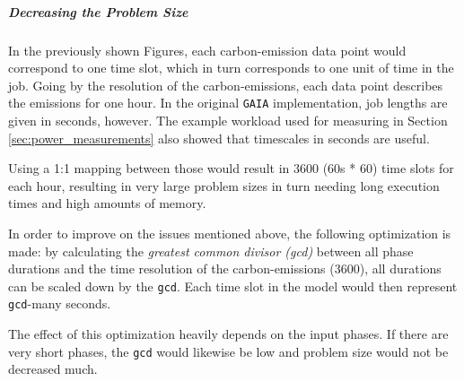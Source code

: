 \subparagraph{Decreasing the Problem Size}

In the previously shown Figures, each carbon-emission data point would correspond to one time slot, which in turn corresponds to one unit of time in the job. 
Going by the resolution of the carbon-emissions, each data point describes the emissions for one hour. 
In the original \verb|GAIA| implementation, job lengths are given in seconds, however. 
The example workload used for measuring in Section \ref{sec:power_measurements} also showed that timescales in seconds are useful. 

Using a 1:1 mapping between those would result in 3600 (60s * 60) time slots for each hour, resulting in very large problem sizes in turn needing long execution times and high amounts of memory.

In order to improve on the issues mentioned above, the following optimization is made: by calculating the \emph{greatest common divisor (gcd)} between all phase durations and the time resolution of the carbon-emissions (3600), all durations can be scaled down by the \verb|gcd|. Each time slot in the model would then represent \verb|gcd|-many seconds.

The effect of this optimization heavily depends on the input phases. 
If there are very short phases, the \verb|gcd| would likewise be low and problem size would not be decreased much. 
